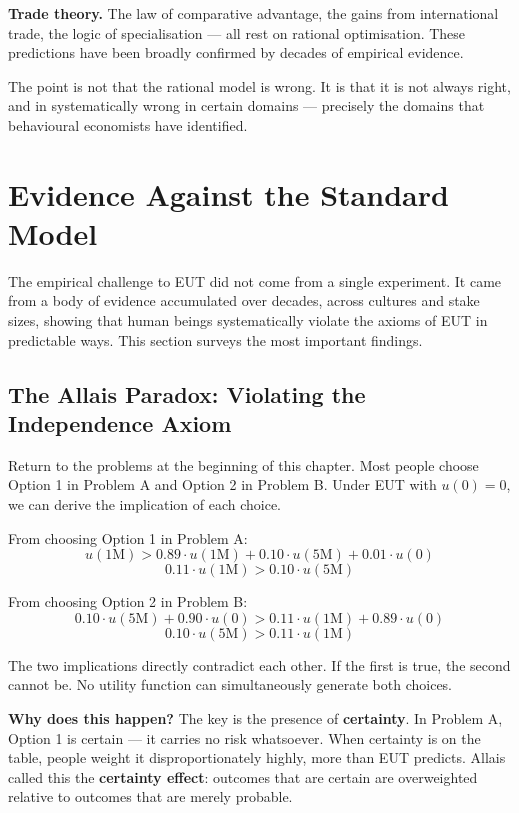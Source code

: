 \documentclass[12pt, letterpaper]{article}
\begin{document}
\textbf{Trade theory.} The law of comparative advantage, the gains from international trade, the logic of specialisation --- all rest on rational optimisation. These predictions have been broadly confirmed by decades of empirical evidence.

The point is not that the rational model is wrong. It is that it is not always right, and in systematically wrong in certain domains --- precisely the domains that behavioural economists have identified.

\medskip


\section{Evidence Against the Standard Model}


The empirical challenge to EUT did not come from a single experiment. It came from a body of evidence accumulated over decades, across cultures and stake sizes, showing that human beings systematically violate the axioms of EUT in predictable ways. This section surveys the most important findings.


\subsection{The Allais Paradox: Violating the Independence Axiom}


Return to the problems at the beginning of this chapter. Most people choose Option 1 in Problem A and Option 2 in Problem B. Under EUT with $u(0) = 0$, we can derive the implication of each choice.

From choosing Option 1 in Problem A: $$u(1\text{M}) > 0.89 \cdot u(1\text{M}) + 0.10 \cdot u(5\text{M}) + 0.01 \cdot u(0)$$ $$0.11 \cdot u(1\text{M}) > 0.10 \cdot u(5\text{M})$$

From choosing Option 2 in Problem B: $$0.10 \cdot u(5\text{M}) + 0.90 \cdot u(0) > 0.11 \cdot u(1\text{M}) + 0.89 \cdot u(0)$$ $$0.10 \cdot u(5\text{M}) > 0.11 \cdot u(1\text{M})$$

The two implications directly contradict each other. If the first is true, the second cannot be. No utility function can simultaneously generate both choices.

\textbf{Why does this happen?} The key is the presence of \textbf{certainty}. In Problem A, Option 1 is certain --- it carries no risk whatsoever. When certainty is on the table, people weight it disproportionately highly, more than EUT predicts. Allais called this the \textbf{certainty effect}: outcomes that are certain are overweighted relative to outcomes that are merely probable.
\end{document}
